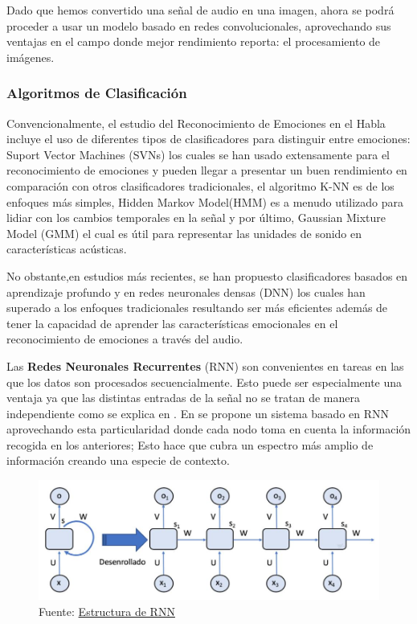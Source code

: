 \documentclass[11pt,a4paper,spanish]{book}
\begin{document}
	Dado que hemos convertido una señal de audio en una imagen, ahora se podrá proceder a usar un modelo basado en redes convolucionales, aprovechando sus ventajas en el campo donde mejor rendimiento reporta: el procesamiento de imágenes.
	
	
	\subsubsection{Algoritmos de Clasificación}
	

	Convencionalmente, el estudio del Reconocimiento de Emociones en el Habla incluye el uso de diferentes tipos de clasificadores para distinguir entre emociones: Suport Vector Machines (SVNs) los cuales se han usado extensamente
	para el reconocimiento de emociones y pueden llegar a presentar un buen rendimiento en comparación con otros clasificadores tradicionales, el algoritmo K-NN es de los enfoques más simples, Hidden Markov Model(HMM) es a menudo utilizado para lidiar con los cambios temporales en la señal y por último, Gaussian Mixture Model (GMM) el cual es útil para representar las unidades de sonido en características acústicas.%
	
	
	No obstante,en estudios más recientes, se han propuesto clasificadores basados en aprendizaje profundo y en redes neuronales densas (DNN) los cuales han superado a los enfoques tradicionales resultando ser más eficientes además de tener la capacidad de aprender las características emocionales en el reconocimiento de emociones a través del audio.
	
	Las \textbf{Redes Neuronales Recurrentes} (RNN) son convenientes en tareas en las que los datos son procesados secuencialmente. Esto puede ser especialmente una ventaja ya que las distintas entradas de la señal no se tratan de manera independiente como se explica en \cite{Lim2017}. En \cite{Lee2015} se propone un sistema basado en RNN aprovechando esta particularidad donde cada nodo toma en cuenta la información recogida en los anteriores; Esto hace que cubra un espectro más amplio de información creando una especie de contexto.
	
	\begin{figure}[H]
		\centering
		\includegraphics[scale=0.25]{rnn_structure.JPG} 
		\caption{Fuente:  \href{http://personal.cimat.mx:8181/~mrivera/cursos/aprendizaje_profundo/RNN_LTSM/introduccion_rnn.html}{Estructura de RNN}}
		\label{fig:rnn_structure}
	\end{figure}
	
\end{document}
